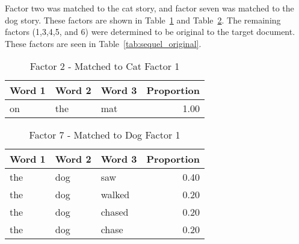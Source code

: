 \documentclass[../ut-dissertation.tex]{subfiles}
\begin{document}
Factor two was matched to the cat story, and factor seven was matched
to the dog story.  These factors are shown in
Table~\ref{tab:catfactor} and Table~\ref{tab:dogfactor}.  The
remaining factors (1,3,4,5, and 6) were determined to be original to
the target document.  These factors are seen in
Table~\ref{tab:sequel_original}.

\begin{table}[p]
  \centering
  \caption{Factor 2 - Matched to Cat Factor 1}\label{tab:catfactor}
  \begin{tabular}{|lll|r|}
    \hline
    Word 1 & Word 2 & Word 3 & Proportion\\
    \hline
    on & the & mat & 1.00\\
    \hline
  \end{tabular}
\end{table}

\begin{table}[p]
  \centering
  \caption{Factor 7 - Matched to Dog Factor 1}\label{tab:dogfactor}
  \begin{tabular}{|lll|r|}
    \hline
    Word 1 & Word 2 & Word 3 & Proportion\\
    \hline
    the & dog & saw & 0.40\\
    the & dog & walked & 0.20\\
    the & dog & chased & 0.20\\
    the & dog & chase & 0.20\\
    \hline
  \end{tabular}
\end{table}
\end{document}
